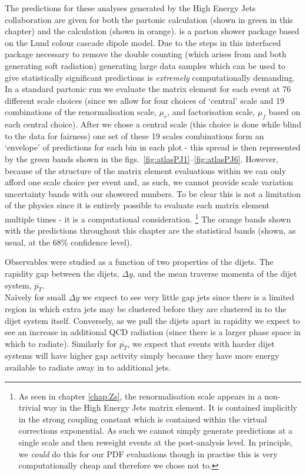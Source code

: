 	The predictions for these analyses generated by the High Energy Jets collaboration
	are given for both the partonic \HEJ calculation (shown in green in this chapter)
	and the \HEJA calculation (shown in orange).
	\ARIADNE is a parton shower package based on the Lund colour cascade dipole model.
	Due to the steps in this interfaced package necessary to remove the double counting
	(which arises from \HEJ and \ARIADNE both generating soft radiation) generating large
	data samples which can be used to give statistically significant predictions is
	\emph{extremely} computationally demanding.  In a standard partonic \HEJ run we
	evaluate the matrix element for each event at 76 different scale choices (since
	we allow for four choices of `central' scale and 19 combinations of the renormalisation
	scale, $\mu_r$, and factorisation scale, $\mu_f$ based on each central choice).
	After we chose a central scale (this choice is done while blind to the data for
	fairness) one set of these 19 scales combinations form an `envelope' of predictions
	for each bin in each plot - this spread is then represented by the green bands shown
	in the figs.~\eqref{fig:atlasPJ1}--\eqref{fig:atlasPJ6}.
	However, because of the structure of the matrix element evaluations within \HEJA
	we can only afford one scale choice per event and, as such, we cannot provide
	scale variation uncertainty bands with our showered numbers.  To be clear this
	is not a limitation of the physics since it is entirely possible to evaluate
	each matrix element multiple times - it is a computational consideration. \footnote{
	As seen in chapter \ref{chap:Zs}, the renormalisation scale appears in a non-trivial way
	in the High Energy Jets matrix element.  It is contained implicitly in the strong coupling
	constant which is contained within the virtual corrections exponential.  As such
	we cannot simply generate predictions at a single scale and then reweight events
	at the post-analysis level.  In principle, we \emph{could} do this for our PDF
	evaluations though in practise this is very computationally cheap and therefore we
	chose not to.}  The orange bands shown with the \HEJA predictions throughout this
	chapter are the statistical bands (shown, as usual, at the 68\% confidence level).

	Observables were studied
	as a function of two properties of the dijets.  The rapidity gap between the dijets,
	$\Delta y$, and the mean traverse momenta of the dijet system, $\overline{p_T}$.\\
	Na\"ively for small $\Delta y$ we expect to see very little gap jets since there is
	a limited region in which extra jets may be clustered before they are clustered in
	to the dijet system itself.   Conversely, as we pull the dijets apart in rapidity
	we expect to see an increase in additional QCD radiation (since there is a larger
	phase space in which to radiate).  Similarly for $\overline{p_T}$, we expect that
	events with harder dijet systems will have higher gap activity simply because they
	have more energy available to radiate away in to additional jets.

